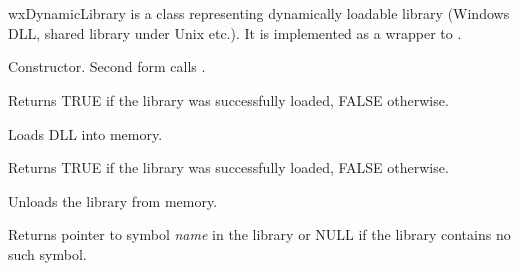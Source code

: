 
\section{}\label{wxdynamiclibrary}

wxDynamicLibrary is a class representing dynamically loadable library
(Windows DLL, shared library under Unix etc.). It is implemented as a wrapper
to .



\label{wxdynamiclibrarywxdynamiclibrary}



Constructor. Second form calls .

\label{wxdynamiclibraryisloaded}


Returns TRUE if the library was successfully loaded, FALSE otherwise.

\label{wxdynamiclibraryload}


Loads DLL into memory.

Returns TRUE if the library was successfully loaded, FALSE otherwise.

\label{wxdynamiclibraryunload}


Unloads the library from memory.

\label{wxdynamiclibrarygetsymbol}


Returns pointer to symbol {\it name} in the library or NULL if the library
contains no such symbol.


